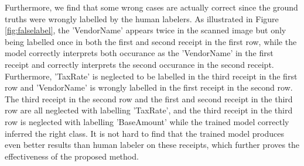 \documentclass[10pt,twocolumn,letterpaper]{article}
\begin{document}
Furthermore, we find that some wrong cases are actually correct since the ground truths were wrongly labelled by the human labelers. As illustrated in Figure \ref{fig:falselabel}, the 'VendorName' appears twice in the scanned image but only being labelled once in both the first and second receipt in the first row, while the model correctly interprets both occurance as the 'VendorName' in the first receipt and correctly interprets the second occurance in the second receipt. Furthermore, 'TaxRate' is neglected to be labelled in the third receipt in the first row and 'VendorName' is wrongly labelled in the first receipt in the second row. The third receipt in the second row and the first and second receipt in the third row are all neglected with labelling 'TaxRate', and the third receipt in the third row is neglected with labelling 'BaseAmount' while the trained model correctly inferred the right class. It is not hard to find that the trained model produces even better results than human labeler on these receipts, which further proves the effectiveness of the proposed method.
\end{document}
